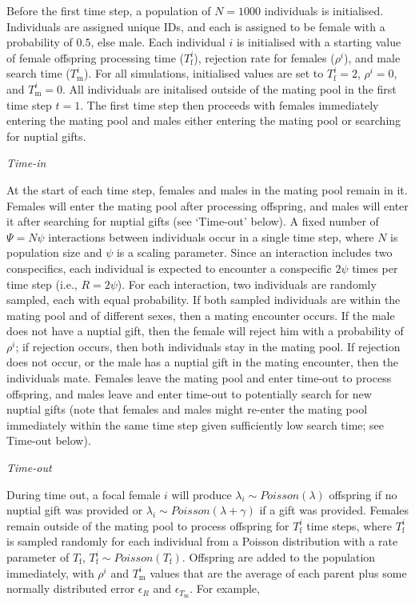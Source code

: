 \documentclass[
]{article}
\begin{document}
Before the first time step, a population of \(N = 1000\) individuals is
initialised. Individuals are assigned unique IDs, and each is assigned
to be female with a probability of \(0.5\), else male. Each individual
\(i\) is initialised with a starting value of female offspring
processing time (\(T^{i}_{\mathrm{f}}\)), rejection rate for females
(\(\rho^{i}\)), and male search time (\(T^{i}_{\mathrm{m}}\)). For all
simulations, initialised values are set to \(T^{i}_{\mathrm{f}} = 2\),
\(\rho^{i} = 0\), and \(T^{i}_{\mathrm{m}} = 0\). All individuals are
initalised outside of the mating pool in the first time step \(t = 1\).
The first time step then proceeds with females immediately entering the
mating pool and males either entering the mating pool or searching for
nuptial gifts.

\emph{Time-in}

At the start of each time step, females and males in the mating pool
remain in it. Females will enter the mating pool after processing
offspring, and males will enter it after searching for nuptial gifts
(see `Time-out' below). A fixed number of \(\Psi = N\psi\) interactions
between individuals occur in a single time step, where \(N\) is
population size and \(\psi\) is a scaling parameter. Since an
interaction includes two conspecifics, each individual is expected to
encounter a conspecific \(2\psi\) times per time step (i.e.,
\(R = 2\psi\)). For each interaction, two individuals are randomly
sampled, each with equal probability. If both sampled individuals are
within the mating pool and of different sexes, then a mating encounter
occurs. If the male does not have a nuptial gift, then the female will
reject him with a probability of \(\rho^{i}\); if rejection occurs, then
both individuals stay in the mating pool. If rejection does not occur,
or the male has a nuptial gift in the mating encounter, then the
individuals mate. Females leave the mating pool and enter time-out to
process offspring, and males leave and enter time-out to potentially
search for new nuptial gifts (note that females and males might re-enter
the mating pool immediately within the same time step given sufficiently
low search time; see Time-out below).

\emph{Time-out}

During time out, a focal female \(i\) will produce
\(\lambda_{i} \sim Poisson(\lambda)\) offspring if no nuptial gift was
provided or \(\lambda_{i} \sim Poisson(\lambda + \gamma)\) if a gift was
provided. Females remain outside of the mating pool to process offspring
for \(T^{i}_{\mathrm{f}}\) time steps, where \(T^{i}_{\mathrm{f}}\) is
sampled randomly for each individual from a Poisson distribution with a
rate parameter of \(T_{\mathrm{f}}\),
\(T^{i}_{\mathrm{f}} \sim Poisson(T_{\mathrm{f}})\). Offspring are added
to the population immediately, with \(\rho^{i}\) and
\(T^{i}_{\mathrm{m}}\) values that are the average of each parent plus
some normally distributed error \(\epsilon_{R}\) and
\(\epsilon_{T_{\mathrm{m}}}\). For example,
\end{document}
